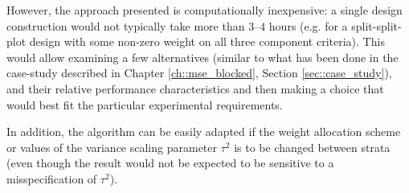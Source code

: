 However, the approach presented is computationally inexpensive: a single design construction would not typically take more than $3$--$4$ hours (e.g. for a split-split-plot design with some non-zero weight on all three component criteria). This would allow examining a few alternatives (similar to what has been done in the case-study described in Chapter \ref{ch::mse_blocked}, Section \ref{sec::case_study}), and their relative performance characteristics and then making a choice that would best fit the particular experimental requirements. 

In addition, the algorithm can be easily adapted if the weight allocation scheme or values of the variance scaling parameter $\tau^2$ is to be changed between strata (even though the result would not be expected to be sensitive to a misspecification of $\tau^2$).




